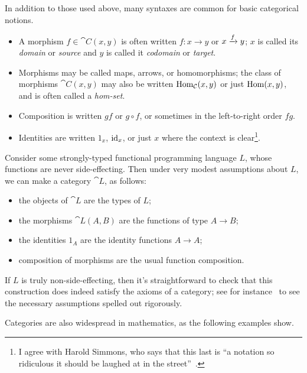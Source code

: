 \begin{ntn}
  In addition to those used above, many syntaxes are common for basic
  categorical notions. \begin{itemize}
    \item A morphism $f\in\cat{C}(x, y)$ is often written $f\colon x\to y$ or $x\xrightarrow{f} y$; $x$ is
      called its \emph{domain} or \emph{source} and $y$ is called it \emph{codomain}
      or \emph{target}.
    \item Morphisms may be called maps, arrows, or homomorphisms; the class of morphisms $\cat{C}(x, y)$ may also be written
      $\operatorname{Hom}_{{\mathcal{C}}}(x, y)$ or just $\operatorname{Hom}(x, y)$, and is often called a \emph{hom-set}.
    \item Composition is written $gf$ or $g\circ f$, or sometimes in the left-to-right
      order $fg$.
    \item Identities are written $1_x$, $\operatorname{id}_x$, or just $x$ where the context
      is clear\footnote{I agree
      with Harold Simmons, who says that this last is ``a notation so ridiculous
      it should be laughed at in the street''~\cite[p. 5]{simmons-2011}.}.
    \end{itemize}
\end{ntn}

\begin{ex}\label{ex:functional programming}
  Consider some strongly-typed functional programming language $L$, whose functions
  are never side-effecting. Then under very modest assumptions about $L$, we
  can make a category $\cat{L}$, as follows:
  \begin{itemize}
    \item the objects of $\cat{L}$ are the types of $L$;
    \item the morphisms $\cat{L}(A, B)$ are the functions of type $A\to B$;
    \item the identities $1_A$ are the identity functions $A\to A$;
    \item composition of morphisms are the usual function composition.
  \end{itemize}

  If $L$ is truly non-side-effecting, then it's straightforward to check
  that this construction does indeed satisfy the axioms of a category; see for
  instance~\cite[subsection 2.2]{barr-wells-1990} to see the necessary assumptions
  spelled out rigorously.
\end{ex}

\noindent
Categories are also widespread in mathematics, as the following examples show.

